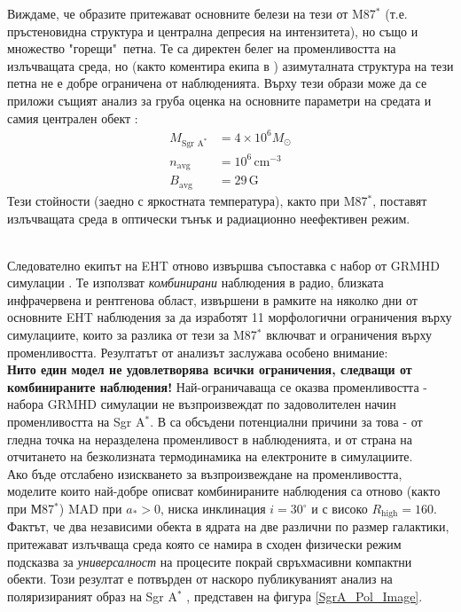\begin{minipage}{22em}
Виждаме, че образите притежават основните белези на тези от M87$^*$ (т.е. пръстеновидна структура и централна депресия на интензитета), но също и множество "горещи"$\,$ петна. Те са директен белег на променливостта на излъчващата среда, но (както коментира екипа в \cite{EHT_SGR_I}) азимуталната структура на тези петна не е добре ограничена от наблюденията. Върху тези образи може да се приложи същият анализ за груба оценка на основните параметри на средата и самия централен обект \cite{EHT_SGR_V}:
\begin{equation}
	\begin{aligned}
	M_{\text{Sgr A}^*} &= 4\times 10^6 M_\odot\\
	n_{\text{avg}} &= 10^6\, \text{cm}^{-3}\\
	B_{\text{avg}} &= 29\, \text{G}
	\end{aligned}
\end{equation}
Тези стойности (заедно с яркостната температура), както при M87$^*$, поставят излъчващата среда в оптически тънък и радиационно неефективен режим.
\end{minipage}\\

\noindent Следователно екипът на EHT отново извършва съпоставка с набор от GRMHD симулации \cite{EHT_SGR_V}. Те използват \emph{комбинирани} наблюдения в радио, близката инфрачервена и рентгенова област, извършени в рамките на няколко дни от основните EHT наблюдения за да изработят 11 морфологични ограничения върху симулациите, които за разлика от тези за M87$^*$ включват и ограничения върху променливостта. Резултатът от анализът заслужава особено внимание:\\

\noindent\textbf{Нито един модел не удовлетворява всички ограничения, следващи от комбинираните наблюдения!} Най-ограничаваща се оказва променливостта - набора GRMHD симулации не възпроизвеждат по задоволителен начин променливостта на Sgr A$^*$. В \cite{EHT_SGR_V} са обсъдени потенциални причини за това - от гледна точка на неразделена променливост в наблюденията, и от страна на отчитането на безколизната термодинамика на електроните в симулациите.\\\newline
Ако бъде отслабено изискването за възпроизвеждане на променливостта, моделите които най-добре описват комбинираните наблюдения са отново (както при М87$^*$) MAD при $a_*>0$, ниска инклинация $i = 30^\circ$ и с високо $R_\text{high} = 160$. Фактът, че два независими обекта в ядрата на две различни по размер галактики, притежават излъчваща среда която се намира в сходен физически режим подсказва за \emph{универсалност} на процесите покрай свръхмасивни компактни обекти. Този резултат е потвърден от наскоро публикуваният анализ на поляризираният образ на Sgr A$^*$ \cite{EHT_SGR_VII}, представен на фигура \ref{SgrA_Pol_Image}.\\

